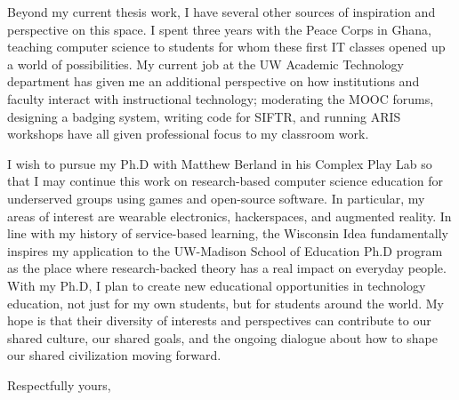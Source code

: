 \documentclass[10pt]{letter}
\begin{document}
\begin{letter}
Beyond my current thesis work, I have several other sources of inspiration and perspective on this space. I spent three years with the Peace Corps in Ghana, teaching computer science to students for whom these first IT classes opened up a world of possibilities. My current job at the UW Academic Technology department has given me an additional perspective on how institutions and faculty interact with instructional technology; moderating the MOOC forums, designing a badging system, writing code for SIFTR, and running ARIS workshops have all given professional focus to my classroom work.

I wish to pursue my Ph.D with Matthew Berland in his Complex Play Lab so that I may continue this work on research-based computer science education for underserved groups using games and open-source software. In particular, my areas of interest are wearable electronics, hackerspaces, and augmented reality. In line with my history of service-based learning, the Wisconsin Idea fundamentally inspires my application to the UW-Madison School of Education Ph.D program as the place where research-backed theory has a real impact on everyday people. With my Ph.D, I plan to create new educational opportunities in technology education, not just for my own students, but for students around the world. My hope is that their diversity of interests and perspectives can contribute to our shared culture, our shared goals, and the ongoing dialogue about how to shape our shared civilization moving forward.

\closing{Respectfully yours,}

\end{letter}
\end{document}
